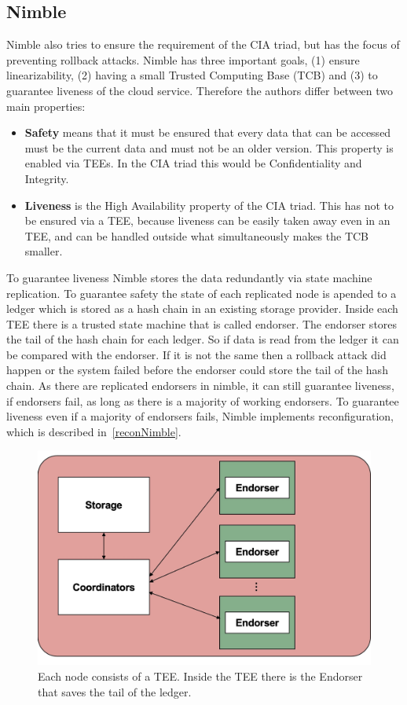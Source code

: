 \subsection{Nimble}
Nimble also tries to ensure the requirement of the CIA triad, but has the focus of preventing rollback attacks.
Nimble has three important goals, (1) ensure linearizability, (2) having a small Trusted Computing Base (TCB) and (3) to guarantee liveness of the cloud service. Therefore the authors differ between two main properties:
\begin{itemize}
	\item \textbf{Safety} means that it must be ensured that every data that can be accessed must be the current data and must not be an older version. This property is enabled via TEEs. In the CIA triad this would be Confidentiality and Integrity.
	\item \textbf{Liveness} is the High Availability property of the CIA triad. This has not to be ensured via a TEE, because liveness can be easily taken away even in an TEE, and can be handled outside what simultaneously makes the TCB smaller.
\end{itemize}
	To guarantee liveness Nimble stores the data redundantly via state machine replication. To guarantee safety the state of each replicated node is apended to a ledger which is stored as a hash chain in an existing storage provider. Inside each TEE there is a trusted state machine that is called endorser. The endorser stores the tail of the hash chain for each ledger. So if data is read from the ledger it can be compared with the endorser. If it is not the same then a rollback attack did happen or the system failed before the endorser could store the tail of the hash chain. As there are replicated endorsers in nimble, it can still guarantee liveness, if endorsers fail, as long as there is a majority of working endorsers. To guarantee liveness even if a majority of endorsers fails, Nimble implements reconfiguration, which is described in~\ref{reconNimble}. 
\begin{figure}[b]
	\includegraphics[scale=0.12]{pictures/nimble}
	\caption{Each node consists of a TEE. Inside the TEE there is the Endorser that saves the tail of the ledger.}
	\label{nimble}
\end{figure}
